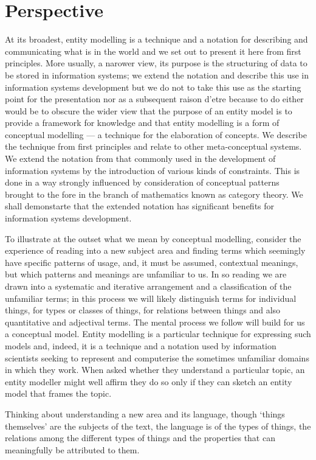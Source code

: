 \section{Perspective}
At its broadest, entity modelling is a technique and a notation for describing and communicating what is in the world and we set out to present it here from first principles. More usually, a narower view, its purpose is the structuring of data to be stored in information systems; we extend the notation and describe this use in information systems development but we do not to take this use as the starting point for the presentation nor as a subsequent raison d'etre because to do either would be to obscure the wider view that the purpose of an entity model is to provide a framework for knowledge and that entity modelling is a form of conceptual modelling — a technique for the elaboration of concepts. We describe the technique from first principles and relate to other meta-conceptual systems. We extend the notation from that commonly used in the development of information systems by the introduction of various kinds of constraints. This is done in a way strongly influenced by consideration of conceptual patterns brought to the fore in the branch of mathematics known as category theory. We shall demonstarte that the extended notation has significant benefits for information systems development.

To illustrate at the outset what we mean by conceptual modelling, consider the experience of reading into a new subject area and finding terms which seemingly have specific patterns of usage, and, it must be assumed, contextual meanings, but which patterns and meanings are unfamiliar to us. In so reading we are drawn into a systematic and iterative arrangement and a classification of the unfamiliar terms; in this process we will likely distinguish terms for individual things, for types or classes of things, for relations between things and also quantitative and adjectival terms. The mental process we follow will build for us a conceptual model. Entity modelling is a particular technique for expressing such models and, indeed, it is a technique and a notation used by information scientists seeking to represent and computerise the sometimes unfamiliar domains in which they work. When asked whether they understand a particular topic, an entity modeller might well affirm they do so only if they can sketch an entity model that frames the topic.

Thinking about understanding a new area and its language, though ‘things themselves’ are the subjects of the text, the language is of the types of things, the relations among the different types of things and the properties that can meaningfully be attributed to them. 

